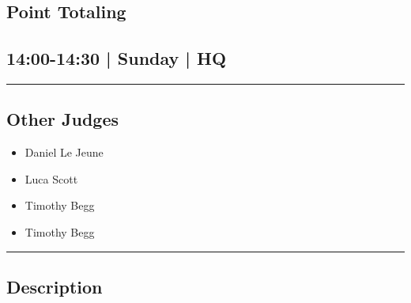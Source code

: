 \documentclass[10pt, A5]{article}
\begin{document}
		\begin{framed}
			\begin{minipage}{\textwidth}

			\setcounter{section}{117}
							\section{Point Totaling}
						
			\subsection*{14:00-14:30 | Sunday | HQ}

			\vspace{0.25cm}
			\hrule
			\vspace{0.25cm}


			\subsection*{Other Judges}
							

				\begin{multicols}{2}

			\begin{itemize}
											\item Daniel Le Jeune
											\item Luca Scott
											\item Timothy Begg
								\end{itemize}

			\vfill\null
			\columnbreak

			\begin{itemize}
											\item Timothy Begg
								\end{itemize}

			\vfill\null

			\end{multicols}

			\vspace{0.25cm}
			\hrule
			\vspace{0.25cm}

			\begin{minipage}{\textwidth}
			\subsection*{\faListAlt \: Description}
			
			\end{minipage}


	\end{minipage}
	\end{framed}
\end{document}
